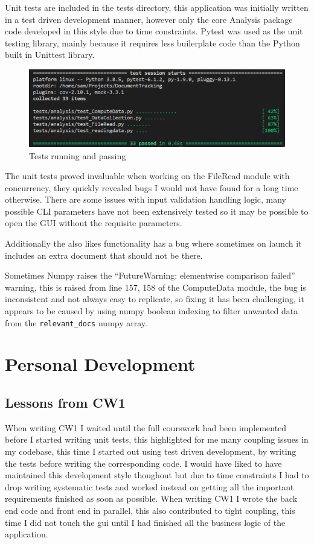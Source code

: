 \documentclass[11pt]{article}
\newcommand{\code}[1]{\colorbox{light-gray}{\texttt{#1}}}
\begin{document}
Unit tests are included in the tests directory, this application was initially written in a test driven development manner, however only the core Analysis package code developed in this style due to time constraints. Pytest was used as the unit testing library, mainly because it requires less builerplate code than the Python built in Unittest library.

\begin{figure}[h]
    \includegraphics{pytest.png}
    \caption{Tests running and passing}
    \label{fig:pytest}
\end{figure}

The unit tests proved invaluable when working on the FileRead module with concurrency, they quickly revealed bugs I would not have found for a long time otherwise.
There are some issues with input validation handling logic, many possible CLI parameters have not been extensively tested so it may be possible to open the GUI without the requisite parameters. 

Additionally the also likes functionality has a bug where sometimes on launch it includes an extra document that should not be there. 

Sometimes Numpy raises the ``FutureWarning: elementwise comparison failed'' warning, this is raised from line 157, 158 of the ComputeData module, the bug is inconsistent and not always easy to replicate, so fixing it has been challenging, it appears to be caused by using numpy boolean indexing to filter unwanted data from the \code{relevant\_docs} numpy array.

\section{Personal Development}
\subsection{Lessons from CW1}
When writing CW1 I waited until the full courswork had been implemented before I started writing unit tests, this highlighted for me many coupling issues in my codebase, this time I started out using test driven development, by writing the tests before writing the corresponding code.
I would have liked to have maintained this development style thoughout but due to time constraints I had to drop writing systematic tests and worked instead on getting all the important requirements finished as soon as possible.
When writing CW1 I wrote the back end code and front end in parallel, this also contributed to tight coupling, this time I did not touch the gui until I had finished all the business logic of the application.
\end{document}
